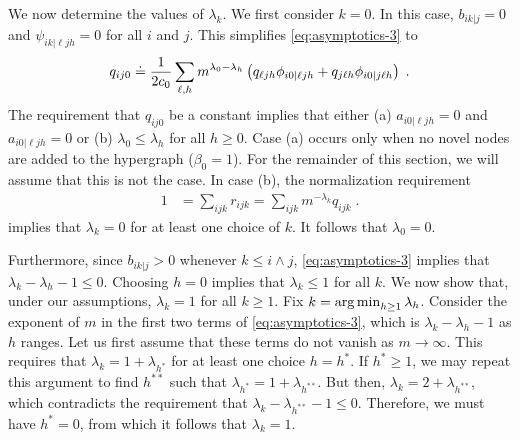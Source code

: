 We now determine the values of $\lambda_k$. 
We first consider $k = 0$. 
In this case, $b_{ik|j} = 0$ and $\psi_{ik|\ell jh} = 0$ for all $i$ and $j$. 
This simplifies \cref{eq:asymptotics-3} to 
\begin{align}
    q_{ij0} \doteq \frac{1}{2c_0}\sum_{\ell, h} m^{\lambda_0-\lambda_h} \left(q_{\ell j h} \phi_{i0|\ell jh} + q_{j \ell h} \phi_{i0|j\ell h}\right)\;.
\end{align}
The requirement that $q_{ij0}$ be a constant implies that either (a) $a_{i0|\ell jh}=0$ and $a_{i0|\ell jh}=0$ or (b) $\lambda_0 \leq \lambda_h$ for all $h \geq 0$. 
Case (a) occurs only when no novel nodes are added to the hypergraph ($\beta_0 = 1$). %
For the remainder of this section, we will assume that this is not the case. 
In case (b), the normalization requirement 
\begin{align}
    1 &= \sum_{ijk} r_{ijk} = \sum_{ijk} m^{-\lambda_k}q_{ijk}\;.
\end{align}
implies that $\lambda_k = 0$ for at least one choice of $k$.
It follows that $\lambda_0 = 0$. 

Furthermore, since $b_{ik|j} > 0$ whenever $k \leq i\land j$, \cref{eq:asymptotics-3} implies that $\lambda_k - \lambda_h - 1 \leq 0$. 
Choosing $h = 0$ implies that $\lambda_k \leq 1$ for all $k$.
We now show that, under our assumptions, $\lambda_k = 1$ for all $k \geq 1$. 
Fix $k = \operatorname*{arg\,min}_{h \geq 1}\lambda_h$. 
Consider the exponent of $m$ in the first two terms of \cref{eq:asymptotics-3}, which is $\lambda_k - \lambda_h - 1$ as $h$ ranges.  
Let us first assume that these terms do not vanish as $m\rightarrow \infty$. 
This requires that $\lambda_k = 1 + \lambda_{h^*}$ for at least one choice  $h = h^*$.
If $h^* \geq 1$, we may repeat this argument to find $h^{**}$ such that $\lambda_{h^*} = 1 + \lambda_{h^{**}}$. 
But then, $\lambda_k = 2 + \lambda_{h^{**}}$, which contradicts the requirement that $\lambda_k - \lambda_{h^{**}} - 1 \leq 0$. 
Therefore, we must have $h^* = 0$, from which it follows that $\lambda_k = 1$. 

